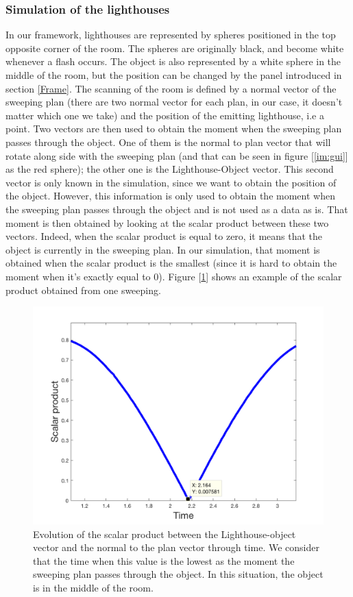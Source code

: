 \documentclass{vldb}
\begin{document}
\subsubsection*{Simulation of the lighthouses}
In our framework, lighthouses are represented by spheres positioned in the top opposite corner of the room. The spheres are originally black, and become white whenever a flash occurs. The object is also represented by a white sphere in the middle of the room, but the position can be changed by the panel introduced in section \ref{Frame}.  \newline
The scanning of the room is defined by a normal vector of the sweeping plan (there are two normal vector for each plan, in our case, it doesn't matter which one we take) and the position of the emitting lighthouse, i.e a point. Two vectors are then used to obtain the moment when the sweeping plan passes through the object. One of them is the normal to plan vector that will rotate along side with the sweeping plan (and that can be seen in figure [\ref{im:gui}] as the red sphere); the other one is the Lighthouse-Object vector. This second vector is only known in the simulation, since we want to obtain the position of the object. However, this information is only used to obtain the moment when the sweeping plan passes through the object and is not used as a data as is. That moment is then obtained by looking at the scalar product between these two vectors. Indeed, when the scalar product is equal to zero, it means that the object is currently in the sweeping plan. In our simulation, that moment is obtained when the scalar product is the smallest (since it is hard to obtain the moment when it's exactly equal to 0). Figure [\ref{im:scalar}] shows an example of the scalar product obtained from one sweeping.

\begin{figure}[h!]
  \includegraphics[scale = 0.21]{Image/scalaire.png}
  \caption{Evolution of the scalar product between the Lighthouse-object vector and the normal to the plan vector through time. We consider that the time when this value is the lowest as the moment the sweeping plan passes through the object. In this situation, the object is in the middle of the room.}
  \label{im:scalar}
\end{figure}
\end{document}
